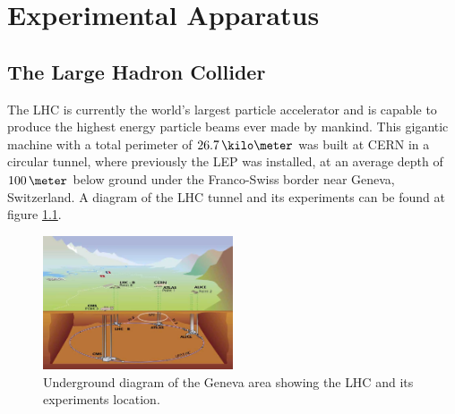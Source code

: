\chapter{Experimental Apparatus}
\label{CHAPTER:ExperimentalApparatus}

\glsresetall %

\section{The Large Hadron Collider}
\label{SECTION:ExperimentalApparatus_LHC}

%

%  

The \gls{LHC}\cite{ARTICLE:LHC Machine} is currently the world's largest particle accelerator and is capable to produce the highest energy particle beams ever made by mankind. This gigantic machine with a total perimeter of $26.7\,\kilo\meter$ was built at \gls{CERN} in a circular tunnel, where previously the \gls{LEP}\cite{LEPTDR:LEPInjectorStudyGroup} was installed, at an average depth of $100\,\meter$ below ground under the Franco-Swiss border near Geneva, Switzerland. A diagram of the \gls{LHC} tunnel and its experiments can be found at figure \ref{FIGURE:ExperimentalApparatus_LHCLayoutUnderground}.

\begin{figure}[!htb]
  \centering
  \includegraphics[width=0.50\textwidth]{Chapter02/LHC/Images/LHC_layout_underground.jpg}
  \caption{Underground diagram of the Geneva area showing the \gls{LHC} and its experiments location.}
  \label{FIGURE:ExperimentalApparatus_LHCLayoutUnderground}
\end{figure}

